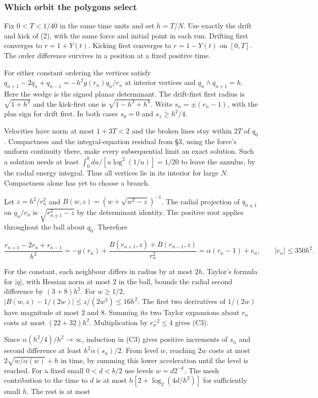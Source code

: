 \documentclass[11pt,a4paper]{article}
\begin{document}
\subsubsection{Which orbit the polygons
select}\label{which-orbit-the-polygons-select}

Fix \(0<T<1/40\) in the same time units and set \(h=T/N\). Use exactly
the drift and kick of (2), with the same force and initial point in each
run. Drifting first converges to \(r=1+Y(t)\). Kicking first converges
to \(r=1-Y(t)\) on \([0,T]\). The order difference survives in a
position at a fixed positive time.

For either constant ordering the vertices satisfy
\(q_{n+1}-2q_n+q_{n-1}=-h^2g(r_n)q_n/r_n\) at interior vertices and
\(q_n\wedge q_{n+1}=h\). Here the wedge is the signed planar
determinant. The drift-first first radius is \(\sqrt{1+h^2}\) and the
kick-first one is \(\sqrt{1-h^2+h^4}\). Write \(s_n=\pm(r_n-1)\), with
the plus sign for drift first. In both cases \(s_0=0\) and
\(s_1\ge h^2/4\).

Velocities have norm at most \(1+3T<2\) and the broken lines stay within
\(2T\) of \(q_0\). Compactness and the integral-equation residual from
§3, using the force's uniform continuity there, make every subsequential
limit an exact solution. Such a solution needs at least
\(\int_0^b du/[u\log^2(1/u)]=1/20\) to leave the annulus, by the radial
energy integral. Thus all vertices lie in its interior for large \(N\).
Compactness alone has yet to choose a branch.

Let \(z=h^2/r_n^2\) and \(B(w,z)=(w+\sqrt{w^2-z})^{-1}\). The radial
projection of \(q_{n\pm1}\) on \(q_n/r_n\) is \(\sqrt{r_{n\pm1}^2-z}\)
by the determinant identity. The positive root applies throughout the
ball about \(q_0\). Therefore

\[
 \frac{r_{n+1}-2r_n+r_{n-1}}{h^2}
 =-g(r_n)+\frac{B(r_{n+1},z)+B(r_{n-1},z)}{r_n^2}
 =\alpha(r_n-1)+e_n,\qquad |e_n|\le350h^2 . \tag{C3}
\]

For the constant, each neighbour differs in radius by at most \(2h\).
Taylor's formula for \(|q|\), with Hessian norm at most \(2\) in the
ball, bounds the radial second difference by \((3+8)h^2\). For
\(w\ge1/2\), \(|B(w,z)-1/(2w)|\le z/(2w^3)\le16h^2\). The first two
derivatives of \(1/(2w)\) have magnitude at most \(2\) and \(8\).
Summing its two Taylor expansions about \(r_n\) costs at most
\((22+32)h^2\). Multiplication by \(r_n^{-2}\le4\) gives (C3).

Since \(\alpha(h^2/4)/h^2\to\infty\), induction in (C3) gives positive
increments of \(s_n\) and second difference at least
\(h^2\alpha(s_n)/2\). From level \(w\), reaching \(2w\) costs at most
\(2\sqrt{w/\alpha(w)}+h\) in time, by summing this lower acceleration
until the level is reached. For a fixed small \(0<d<b/2\) use levels
\(w=d2^{-k}\). The mesh contribution to the time to \(d\) is at most
\(h[2+\log_2(4d/h^2)]\) for sufficiently small \(h\). The rest is at
most
\end{document}
